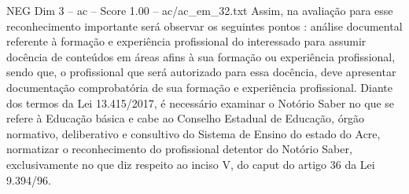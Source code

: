 \begin{textsample}{NEG Dim 3 – ac – Score 1.00 – ac/ac\_em\_32.txt}
Assim, na avaliação para esse reconhecimento importante será observar os seguintes pontos : análise documental referente à formação e experiência profissional do interessado para assumir docência de conteúdos em áreas afins à sua formação ou experiência profissional, sendo que, o profissional que será autorizado para essa docência, deve apresentar documentação comprobatória de sua formação e experiência profissional.
Diante dos termos da Lei 13.415/2017, é necessário examinar o Notório Saber no que se refere à Educação básica e cabe ao Conselho Estadual de Educação, órgão normativo, deliberativo e consultivo do Sistema de Ensino do estado do Acre, normatizar o reconhecimento do profissional detentor do Notório Saber, exclusivamente no que diz respeito ao inciso V, do caput do artigo 36 da Lei 9.394/96.

\end{textsample}
